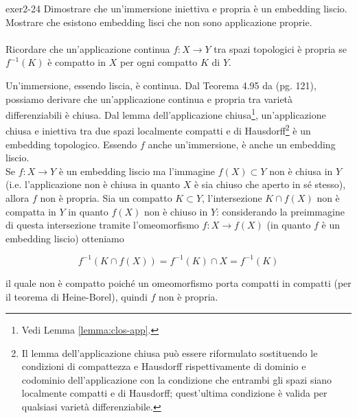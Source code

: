 
{exer2-24}
{
Dimostrare che un'immersione iniettiva e propria è un embedding liscio. Mostrare che esistono embedding lisci che non sono applicazione proprie. \\ \\
Ricordare che un'applicazione continua $ f : X \to Y $ tra spazi topologici è propria se $ f^{-1}(K) $ è compatto in $ X $ per ogni compatto $ K $ di $ Y $.
}
{
Un'immersione, essendo liscia, è continua. Dal Teorema 4.95 da \cite{Lee-top} (pg. 121), possiamo derivare che un'applicazione continua e propria tra varietà differenziabili è chiusa. Dal lemma dell'applicazione chiusa\footnote{%
	Vedi Lemma \ref{lemma:clos-app}.%
}, un'applicazione chiusa e iniettiva tra due spazi localmente compatti e di Hausdorff\footnote{%
	Il lemma dell'applicazione chiusa può essere riformulato sostituendo le condizioni di compattezza e Hausdorff rispettivamente di dominio e codominio dell'applicazione con la condizione che entrambi gli spazi siano localmente compatti e di Hausdorff; quest'ultima condizione è valida per qualsiasi varietà differenziabile.%
} è un embedding topologico. Essendo $ f $ anche un'immersione, è anche un embedding liscio. \\
Se $ f : X \to Y $ è un embedding liscio ma l'immagine $ f(X) \subset Y $ non è chiusa in $ Y $ (i.e. l'applicazione non è chiusa in quanto $ X $ è sia chiuso che aperto in sé stesso), allora $ f $ non è propria. Sia un compatto $ K \subset Y $, l'intersezione $ K \cap f(X) $ non è compatta in $ Y $ in quanto $ f(X) $ non è chiuso in $ Y $: considerando la preimmagine di questa intersezione tramite l'omeomorfismo $ f : X \to f(X) $ (in quanto $ f $ è un embedding liscio) otteniamo

\begin{equation}
	f^{-1}(K \cap f(X)) = f^{-1}(K) \cap X = f^{-1}(K)
\end{equation}

il quale non è compatto poiché un omeomorfismo porta compatti in compatti (per il teorema di Heine-Borel), quindi $ f $ non è propria.
}


